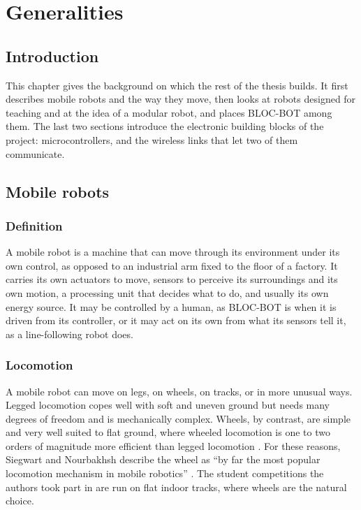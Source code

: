 
\chapter{Generalities}
\label{ch:generalities}

\section{Introduction}
This chapter gives the background on which the rest of the thesis builds. It first
describes mobile robots and the way they move, then looks at robots designed for teaching
and at the idea of a modular robot, and places BLOC-BOT among them. The last two sections
introduce the electronic building blocks of the project: microcontrollers, and the wireless
links that let two of them communicate.

\section{Mobile robots}
\label{sec:mobile-robots}

\subsection{Definition}
A mobile robot is a machine that can move through its environment under its own control,
as opposed to an industrial arm fixed to the floor of a factory. It carries its own
actuators to move, sensors to perceive its surroundings and its own motion, a processing
unit that decides what to do, and usually its own energy source. It may be controlled by a
human, as BLOC-BOT is when it is driven from its controller, or it may act on its own from
what its sensors tell it, as a line-following robot does.

\subsection{Locomotion}
A mobile robot can move on legs, on wheels, on tracks, or in more unusual ways. Legged
locomotion copes well with soft and uneven ground but needs many degrees of freedom and is
mechanically complex. Wheels, by contrast, are simple and very well suited to flat ground,
where wheeled locomotion is one to two orders of magnitude more efficient than legged
locomotion \cite{siegwart2004}. For these reasons, Siegwart and Nourbakhsh describe the
wheel as ``by far the most popular locomotion mechanism in mobile robotics''
\cite{siegwart2004}. The student competitions the authors took part in are run on flat indoor
tracks, where wheels are the natural choice.

